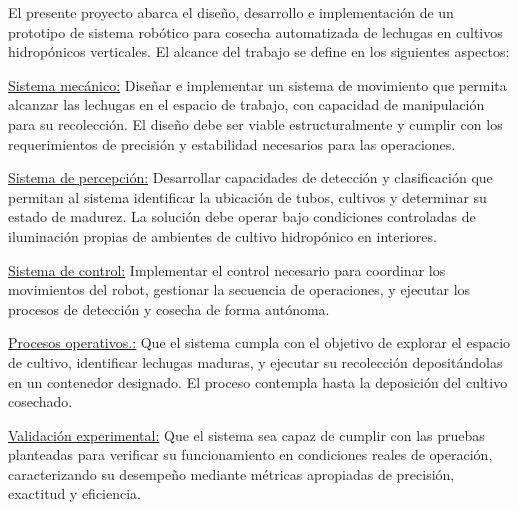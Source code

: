 El presente proyecto abarca el diseño, desarrollo e implementación de un prototipo de sistema robótico para cosecha automatizada de lechugas en cultivos hidropónicos verticales. El alcance del trabajo se define en los siguientes aspectos:

\underline{Sistema mecánico:} Diseñar e implementar un sistema de movimiento que permita alcanzar las lechugas en el espacio de trabajo, con capacidad de manipulación para su recolección. El diseño debe ser viable estructuralmente y cumplir con los requerimientos de precisión y estabilidad necesarios para las operaciones.

\underline{Sistema de percepción:} Desarrollar capacidades de detección y clasificación que permitan al sistema identificar la ubicación de tubos, cultivos y determinar su estado de madurez. La solución debe operar bajo condiciones controladas de iluminación propias de ambientes de cultivo hidropónico en interiores.

\underline{Sistema de control:} Implementar el control necesario para coordinar los movimientos del robot, gestionar la secuencia de operaciones, y ejecutar los procesos de detección y cosecha de forma autónoma.

\underline{Procesos operativos.:} Que el sistema cumpla con el objetivo de explorar el espacio de cultivo, identificar lechugas maduras, y ejecutar su recolección depositándolas en un contenedor designado. El proceso contempla hasta la deposición del cultivo cosechado.

\underline{Validación experimental:} Que el sistema sea capaz de cumplir con las pruebas planteadas para verificar su funcionamiento en condiciones reales de operación, caracterizando su desempeño mediante métricas apropiadas de precisión, exactitud y eficiencia.